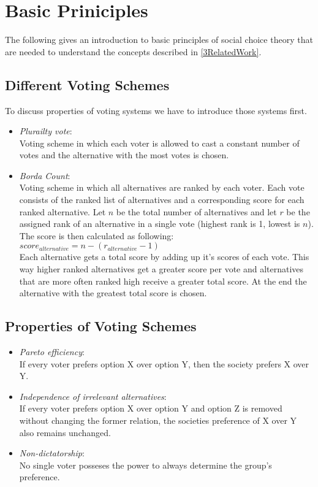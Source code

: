 \documentclass[conference]{IEEEtran}
\begin{document}
\section{Basic Priniciples}\label{2BasicPrinciples}
The following gives an introduction to basic principles of social choice theory that are needed to understand the concepts described in \ref{3RelatedWork}.
\subsection{Different Voting Schemes}
To discuss properties of voting systems we have to introduce those systems first.
\begin{itemize}
    \item \textit{Plurailty vote}:\\
    Voting scheme in which each voter is allowed to cast a constant number of votes and the alternative with the most votes is chosen.
    \item \textit{Borda Count}:\\
    Voting scheme in which all alternatives are ranked by each voter. Each vote consists of the ranked list of alternatives and a corresponding score for each ranked alternative. Let $n$ be the total number of alternatives and let $r$ be the assigned rank of an alternative in a single vote (highest rank is 1, lowest is $n$). The score is then calculated as following:\\
    $score_{alternative}=n-(r_{alternative}-1)$\\
    Each alternative gets a total score by adding up it's scores of each vote. This way higher ranked alternatives get a greater score per vote and alternatives that are more often ranked high receive a greater total score. At the end the alternative with the greatest total score is chosen.
\end{itemize}

\subsection{Properties of Voting Schemes}
\begin{itemize}
    \item \textit{Pareto efficiency}:\\
    If every voter prefers option X over option Y, then the society prefers X over Y.
    \item \textit{Independence of irrelevant alternatives}:\\
    If every voter prefers option X over option Y and option Z is removed without changing the former relation, the societies preference of X over Y also remains unchanged.
    \item \textit{Non-dictatorship}:\\
    No single voter posseses the power to always determine the group's preference.
\end{itemize}
\end{document}
